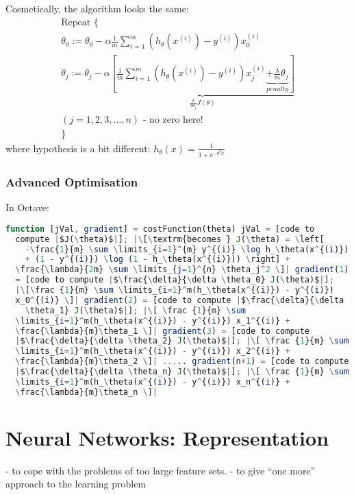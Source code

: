 \documentclass{scrartcl}
\begin{document}
Cosmetically, the algorithm looks the same:
\[ \begin{array}{l}
  \textrm{Repeat }  \{ \\
  \theta_0 := \theta_0 - \alpha \frac {1}{m} \sum
  \limits_{i=1}^m(h_\theta(x^{(i)}) - y^{(i)}) x_0^{(i)} \\
  \theta_j := \theta_j - \alpha \underbrace{ \left[ \frac {1}{m} \sum
      \limits_{i=1}^m(h_\theta(x^{(i)}) - y^{(i)}) x_j^{(i)}
      \underbrace{+ \frac{\lambda}{m}\theta_j } _{penalty}
    \right]}_{\frac{\delta}{\delta \theta_j}J(\theta)} \\
  (j= 1, 2, 3, \dots , n) \textrm{ - no zero here!} \\
  \}
\end{array}
\]
where hypothesis is a bit different: $h_\theta(x) = \frac{1}{1 +
  e^{-\theta^Tx}}$

\subsubsection{Advanced Optimisation}
\label{sec:7-4-2}
In Octave:
\begin{lstlisting}[language=Octave, caption=={Plugin function }]
  function [jVal, gradient] = costFunction(theta) jVal = [code to
  compute |$J(\theta)$|]; |\[\textrm{becomes } J(\theta) = \left[
    -\frac{1}{m} \sum \limits_{i=1}^{m} y^{(i)} \log h_\theta(x^{(i)})
    + (1 - y^{(i)}) \log (1 - h_\theta(x^{(i)})) \right] +
  \frac{\lambda}{2m} \sum \limits_{j=1}^{n} \theta_j^2 \]| gradient(1)
  = [code to compute |$\frac{\delta}{\delta \theta_0} J(\theta)$|];
  |\[\frac {1}{m} \sum \limits_{i=1}^m(h_\theta(x^{(i)}) - y^{(i)})
  x_0^{(i)} \]| gradient(2) = [code to compute |$\frac{\delta}{\delta
    \theta_1} J(\theta)$|]; |\[ \frac {1}{m} \sum
  \limits_{i=1}^m(h_\theta(x^{(i)}) - y^{(i)}) x_1^{(i)} +
  \frac{\lambda}{m}\theta_1 \]| gradient(3) = [code to compute
  |$\frac{\delta}{\delta \theta_2} J(\theta)$|]; |\[ \frac {1}{m} \sum
  \limits_{i=1}^m(h_\theta(x^{(i)}) - y^{(i)}) x_2^{(i)} +
  \frac{\lambda}{m}\theta_2 \]| ..... gradient(n+1) = [code to compute
  |$\frac{\delta}{\delta \theta_n} J(\theta)$|]; |\[ \frac {1}{m} \sum
  \limits_{i=1}^m(h_\theta(x^{(i)}) - y^{(i)}) x_n^{(i)} +
  \frac{\lambda}{m}\theta_n \]|
\end{lstlisting}

\section{Neural Networks: Representation}
\label{sec:8}
- to cope with the problems of too large feature sets. - to give ``one
more'' approach to the learning problem
\end{document}
